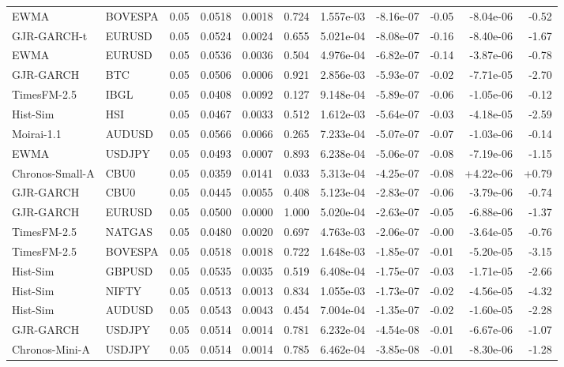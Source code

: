 \begin{tabular}{llrrrrrrrrr}
EWMA & BOVESPA & 0.05 & 0.0518 & 0.0018 & 0.724 & 1.557e-03 & -8.16e-07 & -0.05 & -8.04e-06 & -0.52 \\
GJR-GARCH-t & EURUSD & 0.05 & 0.0524 & 0.0024 & 0.655 & 5.021e-04 & -8.08e-07 & -0.16 & -8.40e-06 & -1.67 \\
EWMA & EURUSD & 0.05 & 0.0536 & 0.0036 & 0.504 & 4.976e-04 & -6.82e-07 & -0.14 & -3.87e-06 & -0.78 \\
GJR-GARCH & BTC & 0.05 & 0.0506 & 0.0006 & 0.921 & 2.856e-03 & -5.93e-07 & -0.02 & -7.71e-05 & -2.70 \\
TimesFM-2.5 & IBGL & 0.05 & 0.0408 & 0.0092 & 0.127 & 9.148e-04 & -5.89e-07 & -0.06 & -1.05e-06 & -0.12 \\
Hist-Sim & HSI & 0.05 & 0.0467 & 0.0033 & 0.512 & 1.612e-03 & -5.64e-07 & -0.03 & -4.18e-05 & -2.59 \\
Moirai-1.1 & AUDUSD & 0.05 & 0.0566 & 0.0066 & 0.265 & 7.233e-04 & -5.07e-07 & -0.07 & -1.03e-06 & -0.14 \\
EWMA & USDJPY & 0.05 & 0.0493 & 0.0007 & 0.893 & 6.238e-04 & -5.06e-07 & -0.08 & -7.19e-06 & -1.15 \\
Chronos-Small-A & CBU0 & 0.05 & 0.0359 & 0.0141 & 0.033 & 5.313e-04 & -4.25e-07 & -0.08 & +4.22e-06 & +0.79 \\
GJR-GARCH & CBU0 & 0.05 & 0.0445 & 0.0055 & 0.408 & 5.123e-04 & -2.83e-07 & -0.06 & -3.79e-06 & -0.74 \\
GJR-GARCH & EURUSD & 0.05 & 0.0500 & 0.0000 & 1.000 & 5.020e-04 & -2.63e-07 & -0.05 & -6.88e-06 & -1.37 \\
TimesFM-2.5 & NATGAS & 0.05 & 0.0480 & 0.0020 & 0.697 & 4.763e-03 & -2.06e-07 & -0.00 & -3.64e-05 & -0.76 \\
TimesFM-2.5 & BOVESPA & 0.05 & 0.0518 & 0.0018 & 0.722 & 1.648e-03 & -1.85e-07 & -0.01 & -5.20e-05 & -3.15 \\
Hist-Sim & GBPUSD & 0.05 & 0.0535 & 0.0035 & 0.519 & 6.408e-04 & -1.75e-07 & -0.03 & -1.71e-05 & -2.66 \\
Hist-Sim & NIFTY & 0.05 & 0.0513 & 0.0013 & 0.834 & 1.055e-03 & -1.73e-07 & -0.02 & -4.56e-05 & -4.32 \\
Hist-Sim & AUDUSD & 0.05 & 0.0543 & 0.0043 & 0.454 & 7.004e-04 & -1.35e-07 & -0.02 & -1.60e-05 & -2.28 \\
GJR-GARCH & USDJPY & 0.05 & 0.0514 & 0.0014 & 0.781 & 6.232e-04 & -4.54e-08 & -0.01 & -6.67e-06 & -1.07 \\
Chronos-Mini-A & USDJPY & 0.05 & 0.0514 & 0.0014 & 0.785 & 6.462e-04 & -3.85e-08 & -0.01 & -8.30e-06 & -1.28 \\

\end{tabular}
